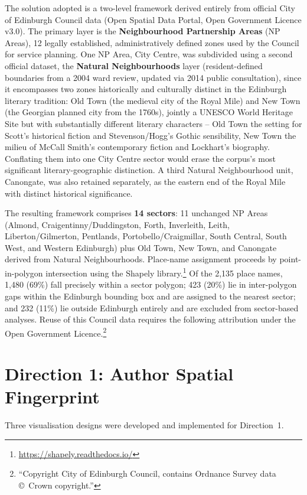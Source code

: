 \documentclass[logo,msc]{infthesis}
\begin{document}
The solution adopted is a two-level framework derived entirely from official City of Edinburgh Council data (Open Spatial Data Portal, Open Government Licence v3.0). The primary layer is the \textbf{Neighbourhood Partnership Areas} (NP Areas), 12 legally established, administratively defined zones used by the Council for service planning. One NP Area, City Centre, was subdivided using a second official dataset, the \textbf{Natural Neighbourhoods} layer (resident-defined boundaries from a 2004 ward review, updated via 2014 public consultation), since it encompasses two zones historically and culturally distinct in the Edinburgh literary tradition: Old Town (the medieval city of the Royal Mile) and New Town (the Georgian planned city from the 1760s), jointly a UNESCO World Heritage Site but with substantially different literary characters -- Old Town the setting for Scott's historical fiction and Stevenson/Hogg's Gothic sensibility, New Town the milieu of McCall Smith's contemporary fiction and Lockhart's biography. Conflating them into one City Centre sector would erase the corpus's most significant literary-geographic distinction. A third Natural Neighbourhood unit, Canongate, was also retained separately, as the eastern end of the Royal Mile with distinct historical significance.
 
The resulting framework comprises \textbf{14 sectors}: 11 unchanged NP Areas (Almond, Craigentinny/Duddingston, Forth, Inverleith, Leith, Liberton/Gilmerton, Pentlands, Portobello/Craigmillar, South Central, South West, and Western Edinburgh) plus Old Town, New Town, and Canongate derived from Natural Neighbourhoods. Place-name assignment proceeds by point-in-polygon intersection using the Shapely library.\footnote{\url{https://shapely.readthedocs.io/}} Of the 2,135 place names, 1,480 (69\%) fall precisely within a sector polygon; 423 (20\%) lie in inter-polygon gaps within the Edinburgh bounding box and are assigned to the nearest sector; and 232 (11\%) lie outside Edinburgh entirely and are excluded from sector-based analyses. Reuse of this Council data requires the following attribution under the Open Government Licence.\footnote{``Copyright City of Edinburgh Council, contains Ordnance Survey data \copyright\ Crown copyright.''}
 
\section{Direction 1: Author Spatial Fingerprint}
 
Three visualisation designs were developed and implemented for Direction~1.
 
\end{document}
